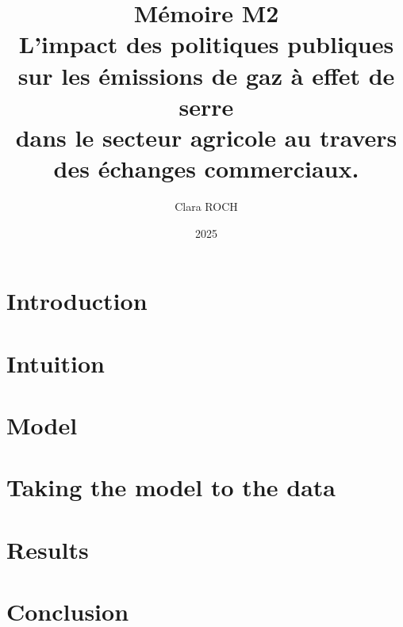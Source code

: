 \documentclass[10pt,twoside]{report}
\title{%
    Mémoire M2 \\
    \large L'impact des politiques publiques sur les émissions de gaz à effet de serre \\ dans le secteur agricole au travers des échanges commerciaux.}
\author{Clara ROCH}
\date{2025}
\begin{document}
\maketitle
\tableofcontents

\chapter{Introduction}


\chapter{Intuition}\label{intuition}


\chapter{Model}\label{model}


\chapter{Taking the model to the data}\label{data}


\chapter{Results}\label{results}


\chapter{Conclusion}


\appendix 

\end{document}
